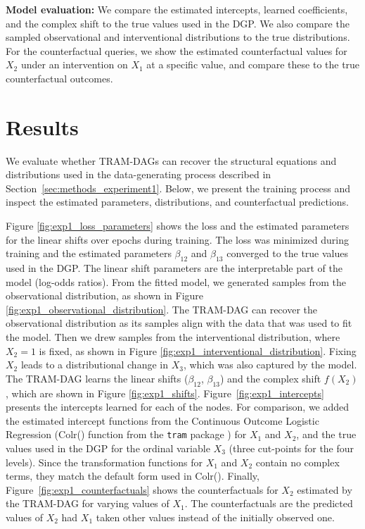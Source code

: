 \textbf{Model evaluation: } We compare the estimated intercepts, learned coefficients, and the complex shift to the true values used in the DGP. We also compare the sampled observational and interventional distributions to the true distributions. For the counterfactual queries, we show the estimated counterfactual values for $X_2$ under an intervention on $X_1$ at a specific value, and compare these to the true counterfactual outcomes.




\section{Results}



We evaluate whether TRAM-DAGs can recover the structural equations and distributions used in the data-generating process described in Section~\ref{sec:methods_experiment1}. Below, we present the training process and inspect the estimated parameters, distributions, and counterfactual predictions.

Figure \ref{fig:exp1_loss_parameters} shows the loss and the estimated parameters for the linear shifts over epochs during training. The loss was minimized during training and the estimated parameters $\beta_{12}$ and $\beta_{13}$ converged to the true values used in the DGP. The linear shift parameters are the interpretable part of the model (log-odds ratios). From the fitted model, we generated samples from the observational distribution, as shown in Figure \ref{fig:exp1_observational_distribution}. The TRAM-DAG can recover the observational distribution as its samples align with the data that was used to fit the model. Then we drew samples from the interventional distribution, where $X_2 = 1$ is fixed, as shown in Figure \ref{fig:exp1_interventional_distribution}. Fixing $X_2$ leads to a distributional change in $X_3$, which was also captured by the model. The TRAM-DAG learns the linear shifts ($\beta_{12}$, $\beta_{13}$) and the complex shift $f(X_2)$, which are shown in Figure \ref{fig:exp1_shifts}. Figure~\ref{fig:exp1_intercepts} presents the intercepts learned for each of the nodes. For comparison, we added the estimated intercept functions from the Continuous Outcome Logistic Regression (Colr() function from the \texttt{tram} package \citep{hothorn2018}) for $X_1$ and $X_2$, and the true values used in the DGP for the ordinal variable $X_3$ (three cut-points for the four levels). Since the transformation functions for $X_1$ and $X_2$ contain no complex terms, they match the default form used in Colr(). Finally, Figure~\ref{fig:exp1_counterfactuals} shows the counterfactuals for $X_2$ estimated by the TRAM-DAG for varying values of $X_1$. The counterfactuals are the predicted values of $X_2$ had $X_1$ taken other values instead of the initially observed one. 

